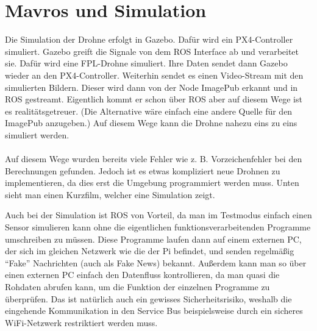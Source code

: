 \section{Mavros und Simulation}
Die Simulation der Drohne erfolgt in Gazebo. Dafür wird ein PX4-Controller simuliert. Gazebo greift die Signale von dem ROS Interface ab und verarbeitet sie. Dafür wird eine FPL-Drohne simuliert. Ihre Daten sendet dann Gazebo wieder an den PX4-Controller. Weiterhin sendet es einen Video-Stream mit den simulierten Bildern. Dieser wird dann von der Node ImagePub erkannt und in ROS gestreamt. Eigentlich kommt er schon über ROS aber auf diesem Wege ist es realitätsgetreuer. (Die Alternative wäre einfach eine andere Quelle für den ImagePub anzugeben.) Auf diesem Wege kann die Drohne nahezu eins zu eins simuliert werden. \\
\\
Auf diesem Wege wurden bereits viele Fehler wie z. B. Vorzeichenfehler bei den Berechnungen gefunden. Jedoch ist es etwas kompliziert neue Drohnen zu implementieren, da dies erst die Umgebung programmiert werden muss. Unten sieht man einen Kurzfilm, welcher eine Simulation zeigt.


Auch bei der Simulation ist ROS von Vorteil, da man im Testmodus einfach einen Sensor simulieren kann ohne die eigentlichen funktionsverarbeitenden Programme umschreiben zu müssen. Diese Programme laufen dann auf einem externen PC, der sich im gleichen Netzwerk wie die der Pi befindet, und senden regelmäßig ``Fake'' Nachrichten (auch als Fake News) bekannt.
Außerdem kann man so über einen externen PC einfach den Datenfluss kontrollieren, da man quasi die Rohdaten abrufen kann, um die Funktion der einzelnen Programme zu überprüfen. Das ist natürlich auch ein gewisses Sicherheitsrisiko, weshalb die eingehende Kommunikation in den Service Bus beispielsweise durch ein sicheres WiFi-Netzwerk restriktiert werden muss. 

